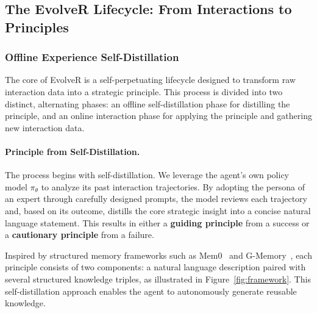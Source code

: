 \subsection{The EvolveR Lifecycle: From Interactions to Principles}
\subsubsection{Offline Experience Self-Distillation}

The core of EvolveR is a self-perpetuating lifecycle designed to transform raw interaction data into a strategic principle. This process is divided into two distinct, alternating phases: an offline self-distillation phase for distilling the principle, and an online interaction phase for applying the principle and gathering new interaction data.

\paragraph{Principle from Self-Distillation.}
The process begins with self-distillation. We leverage the agent's own policy model $\pi_\theta$ to analyze its past interaction trajectories. By adopting the persona of an expert through carefully designed prompts, the model reviews each trajectory and, based on its outcome, distills the core strategic insight into a concise natural language statement. This results in either a \textbf{guiding principle} from a success or a \textbf{cautionary principle} from a failure. 

Inspired by structured memory frameworks such as Mem0~\citep{chhikara2025mem0buildingproductionreadyai} and G-Memory~\citep{zhang2025gmemorytracinghierarchicalmemory}, each principle consists of two components: a natural language description paired with several structured knowledge triples, as illustrated in Figure~\ref{fig:framework}. 
This self-distillation approach enables the agent to autonomously generate reusable knowledge. 


